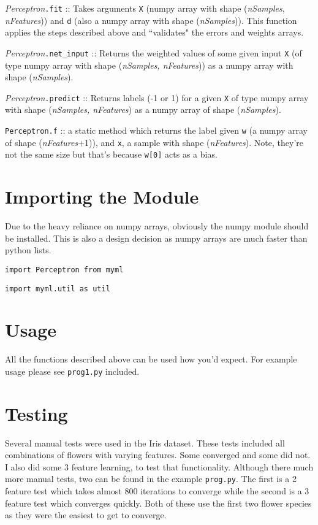 \documentclass{article}
\begin{document}
\textit{Perceptron}\texttt{.fit} :: Takes arguments \texttt{X} (numpy array
with shape (\textit{nSamples}, \textit{nFeatures})) and \texttt{d} (also a
numpy array with shape (\textit{nSamples})). This function applies the steps
described above and ``validates" the errors and weights arrays.

\textit{Perceptron}\texttt{.net\_input} :: Returns the weighted values of some
given input \texttt{X} (of type numpy array with shape
(\textit{nSamples, nFeatures})) as a numpy array with shape (\textit{nSamples}).

\textit{Perceptron}\texttt{.predict} :: Returns labels (-1 or 1) for a given
\texttt{X} of type numpy array with shape (\textit{nSamples, nFeatures}) as a
numpy array of shape (\textit{nSamples}).

\texttt{Perceptron.f} :: a static method which returns the label given
\texttt{w} (a numpy array of shape (\textit{nFeatures}+1)), and \texttt{x}, a
sample with shape (\textit{nFeatures}). Note, they're not the same size but
that's because \texttt{w[0]} acts as a bias.

\section{Importing the Module}

Due to the heavy reliance on numpy arrays, obviously the numpy module should
be installed. This is also a design decision as numpy arrays are much faster
than python lists.

\texttt{import Perceptron from myml}

\texttt{import myml.util as util}

\section{Usage}

All the functions described above can be used how you'd expect. For example
usage please see \texttt{prog1.py} included.

\section{Testing}

Several manual tests were used in the Iris dataset. These tests included all
combinations of flowers with varying features. Some converged and some did not.
I also did some 3 feature learning, to test that functionality. Although there
much more manual tests, two can be found in the example \texttt{prog.py}. The
first is a 2 feature test which takes almost 800 iterations to converge while
the second is a 3 feature test which converges quickly. Both of these use the
first two flower species as they were the easiest to get to converge.
\end{document}
